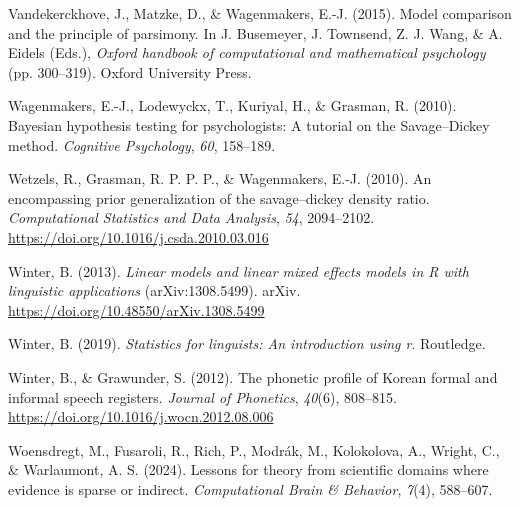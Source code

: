 \documentclass[
  doc,
  floatsintext,
  longtable,
  nolmodern,
  notxfonts,
  notimes,
  colorlinks=true,linkcolor=blue,citecolor=blue,urlcolor=blue]{apa7}
\newlength{\cslhangindent}
\newenvironment{CSLReferences}[2] %
 {\begin{list}{}{%
  \setlength{\itemindent}{0pt}
  \setlength{\leftmargin}{0pt}
  \setlength{\parsep}{0pt}
  \ifodd #1
   \setlength{\leftmargin}{\cslhangindent}
   \setlength{\itemindent}{-1\cslhangindent}
  \fi
  \setlength{\itemsep}{#2\baselineskip}}}
 {\end{list}}
\begin{document}
\begin{CSLReferences}{1}{0}
Vandekerckhove, J., Matzke, D., \& Wagenmakers, E.-J. (2015). Model
comparison and the principle of parsimony. In J. Busemeyer, J. Townsend,
Z. J. Wang, \& A. Eidels (Eds.), \emph{Oxford handbook of computational
and mathematical psychology} (pp. 300--319). Oxford University Press.

Wagenmakers, E.-J., Lodewyckx, T., Kuriyal, H., \& Grasman, R. (2010).
Bayesian hypothesis testing for psychologists: {A} tutorial on the
{S}avage--{D}ickey method. \emph{Cognitive Psychology}, \emph{60},
158--189.

Wetzels, R., Grasman, R. P. P. P., \& Wagenmakers, E.-J. (2010). An
encompassing prior generalization of the savage--dickey density ratio.
\emph{Computational Statistics and Data Analysis}, \emph{54},
2094--2102. \url{https://doi.org/10.1016/j.csda.2010.03.016}

Winter, B. (2013). \emph{Linear models and linear mixed effects models
in {R} with linguistic applications} (arXiv:1308.5499). arXiv.
\url{https://doi.org/10.48550/arXiv.1308.5499}

Winter, B. (2019). \emph{Statistics for linguists: An introduction using
r}. Routledge.

Winter, B., \& Grawunder, S. (2012). The phonetic profile of {Korean}
formal and informal speech registers. \emph{Journal of Phonetics},
\emph{40}(6), 808--815. \url{https://doi.org/10.1016/j.wocn.2012.08.006}

Woensdregt, M., Fusaroli, R., Rich, P., Modrák, M., Kolokolova, A.,
Wright, C., \& Warlaumont, A. S. (2024). Lessons for theory from
scientific domains where evidence is sparse or indirect.
\emph{Computational Brain \& Behavior}, \emph{7}(4), 588--607.

\end{CSLReferences}
\end{document}
